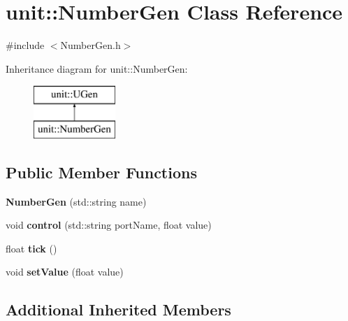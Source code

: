 \hypertarget{classunit_1_1NumberGen}{\section{unit\-:\-:Number\-Gen Class Reference}
\label{classunit_1_1NumberGen}
}


{\ttfamily \#include $<$Number\-Gen.\-h$>$}

Inheritance diagram for unit\-:\-:Number\-Gen\-:\begin{figure}[H]
\begin{center}
\leavevmode
\includegraphics[height=2.000000cm]{classunit_1_1NumberGen}
\end{center}
\end{figure}
\subsection*{Public Member Functions}
\begin{DoxyCompactItemize}
\item 
\hypertarget{classunit_1_1NumberGen_a6e93812c4805a43f19f8fb11680e32a4}{{\bfseries Number\-Gen} (std\-::string name)}\label{classunit_1_1NumberGen_a6e93812c4805a43f19f8fb11680e32a4}

\item 
\hypertarget{classunit_1_1NumberGen_a9daaaf8a12389873494bb1ad2f877c8c}{void {\bfseries control} (std\-::string port\-Name, float value)}\label{classunit_1_1NumberGen_a9daaaf8a12389873494bb1ad2f877c8c}

\item 
\hypertarget{classunit_1_1NumberGen_a38cef7d64a12e40bf2ae14f29def41ca}{float {\bfseries tick} ()}\label{classunit_1_1NumberGen_a38cef7d64a12e40bf2ae14f29def41ca}

\item 
\hypertarget{classunit_1_1NumberGen_ad5c107c90a5bc6cf7bbc39562db9d9e3}{void {\bfseries set\-Value} (float value)}\label{classunit_1_1NumberGen_ad5c107c90a5bc6cf7bbc39562db9d9e3}

\end{DoxyCompactItemize}
\subsection*{Additional Inherited Members}



